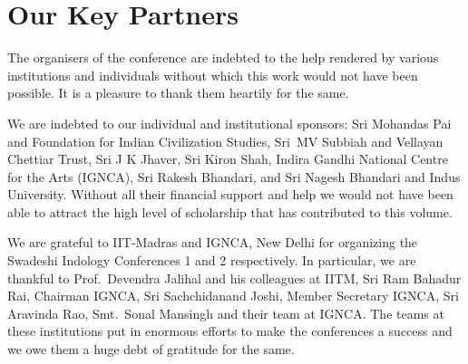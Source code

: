 \chapter*{Our Key Partners}\label{keypartners}

The organisers of the conference are indebted to the help rendered by various 
institutions and individuals without which this work would not have been 
possible. It is a pleasure to thank them heartily for the same.

We are indebted to our individual and institutional sponsors: Sri Mohandas Pai 
and Foundation for Indian Civilization Studies, Sri~MV Subbiah and Vellayan Chettiar 
Trust, Sri J K Jhaver, Sri Kiron Shah, Indira Gandhi National Centre for the Arts (IGNCA), 
Sri Rakesh Bhandari, and Sri Nagesh Bhandari and Indus University. Without all their 
financial support and help we would not have been able to attract the high level of 
scholarship that has contributed to this volume.

We are grateful to IIT-Madras and IGNCA, New Delhi for organizing the Swadeshi 
Indology Conferences 1 and 2 respectively. In particular, we are thankful to 
Prof.\ Devendra Jalihal and his colleagues at IITM, Sri Ram Bahadur Rai, Chairman 
IGNCA, Sri Sachchidanand Joshi, Member Secretary IGNCA, Sri Aravinda Rao, 
Smt.\ Sonal Mansingh and their team at IGNCA.  The teams at these institutions 
put in enormous efforts to make the conferences a success and we owe them a 
huge debt of gratitude for the same. 


